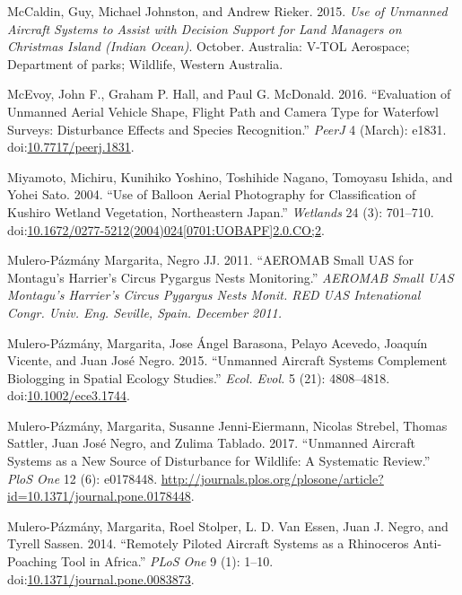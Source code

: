 \documentclass[]{interact}
\theoremstyle{plain}%
\theoremstyle{definition}
\theoremstyle{remark}
\begin{document}
\hypertarget{ref-mccaldin_use_2015}{}
McCaldin, Guy, Michael Johnston, and Andrew Rieker. 2015. \emph{Use of
Unmanned Aircraft Systems to Assist with Decision Support for Land
Managers on Christmas Island (Indian Ocean)}. October. Australia: V-TOL
Aerospace; Department of parks; Wildlife, Western Australia.

\hypertarget{ref-mcevoy_evaluation_2016}{}
McEvoy, John F., Graham P. Hall, and Paul G. McDonald. 2016.
``Evaluation of Unmanned Aerial Vehicle Shape, Flight Path and Camera
Type for Waterfowl Surveys: Disturbance Effects and Species
Recognition.'' \emph{PeerJ} 4 (March): e1831.
doi:\href{https://doi.org/10.7717/peerj.1831}{10.7717/peerj.1831}.

\hypertarget{ref-miyamoto_use_2004}{}
Miyamoto, Michiru, Kunihiko Yoshino, Toshihide Nagano, Tomoyasu Ishida,
and Yohei Sato. 2004. ``Use of Balloon Aerial Photography for
Classification of Kushiro Wetland Vegetation, Northeastern Japan.''
\emph{Wetlands} 24 (3): 701--710.
doi:\href{https://doi.org/10.1672/0277-5212(2004)024\%5B0701:UOBAPF\%5D2.0.CO;2}{10.1672/0277-5212(2004)024{[}0701:UOBAPF{]}2.0.CO;2}.

\hypertarget{ref-mulero-pazmany_margarita_aeromab_2011}{}
Mulero-Pázmány Margarita, Negro JJ. 2011. ``AEROMAB Small UAS for
Montagu's Harrier's Circus Pygargus Nests Monitoring.'' \emph{AEROMAB
Small UAS Montagu's Harrier's Circus Pygargus Nests Monit. RED UAS
Intenational Congr. Univ. Eng. Seville, Spain. December 2011.}

\hypertarget{ref-mulero-pazmany_unmanned_2015}{}
Mulero-Pázmány, Margarita, Jose Ángel Barasona, Pelayo Acevedo, Joaquín
Vicente, and Juan José Negro. 2015. ``Unmanned Aircraft Systems
Complement Biologging in Spatial Ecology Studies.'' \emph{Ecol. Evol.} 5
(21): 4808--4818.
doi:\href{https://doi.org/10.1002/ece3.1744}{10.1002/ece3.1744}.

\hypertarget{ref-mulero-pazmany_unmanned_2017}{}
Mulero-Pázmány, Margarita, Susanne Jenni-Eiermann, Nicolas Strebel,
Thomas Sattler, Juan José Negro, and Zulima Tablado. 2017. ``Unmanned
Aircraft Systems as a New Source of Disturbance for Wildlife: A
Systematic Review.'' \emph{PloS One} 12 (6): e0178448.
\url{http://journals.plos.org/plosone/article?id=10.1371/journal.pone.0178448}.

\hypertarget{ref-mulero-pazmany_remotely_2014}{}
Mulero-Pázmány, Margarita, Roel Stolper, L. D. Van Essen, Juan J. Negro,
and Tyrell Sassen. 2014. ``Remotely Piloted Aircraft Systems as a
Rhinoceros Anti-Poaching Tool in Africa.'' \emph{PLoS One} 9 (1): 1--10.
doi:\href{https://doi.org/10.1371/journal.pone.0083873}{10.1371/journal.pone.0083873}.
\end{document}
